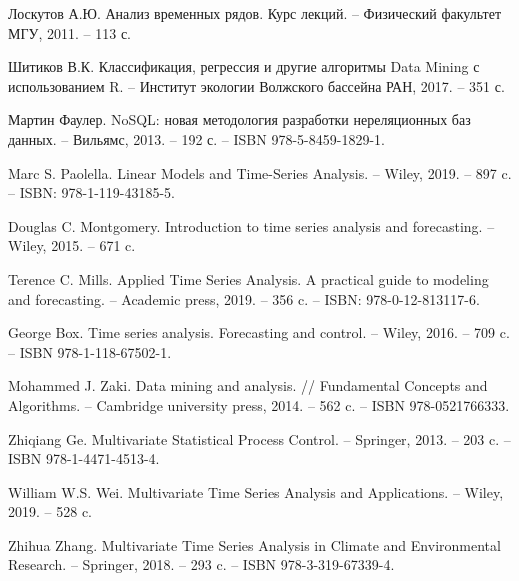 \begingroup 
\renewcommand{\section}[2]{\anonsection{Список литературы}}
\begin{thebibliography}{00}

    Лоскутов А.Ю.
    Анализ временных рядов.
    Курс лекций.
    -- Физический факультет МГУ, 2011. -- 113 с.

    Шитиков В.К.
    Классификация, регрессия и другие алгоритмы Data Mining
    с использованием R.
    -- Институт экологии Волжского бассейна РАН, 2017. -- 351 с.

    Мартин Фаулер.
    NoSQL: новая методология разработки нереляционных баз данных.
    -- Вильямс, 2013. -- 192 с.
    -- ISBN 978-5-8459-1829-1.

    Marc S. Paolella.
    Linear Models and Time-Series Analysis.
    -- Wiley, 2019. -- 897 c.
    -- ISBN: 978-1-119-43185-5.

    Douglas C. Montgomery.
    Introduction to time series analysis and forecasting.
    -- Wiley, 2015. -- 671 c.

    Terence C. Mills.
    Applied Time Series Analysis.
    A practical guide to modeling and forecasting.
    -- Academic press, 2019. -- 356 c.
    -- ISBN: 978-0-12-813117-6.

    George Box.
    Time series analysis.
    Forecasting and control.
    -- Wiley, 2016. -- 709 c.
    -- ISBN 978-1-118-67502-1.

    Mohammed J. Zaki.
    Data mining and analysis. //
    Fundamental Concepts and Algorithms.
    -- Cambridge university press, 2014. -- 562 c.
    -- ISBN 978-0521766333.

    Zhiqiang Ge.
    Multivariate Statistical Process Control.
    -- Springer, 2013. -- 203 c.
    -- ISBN 978-1-4471-4513-4.

    William W.S. Wei.
    Multivariate Time Series Analysis and Applications.
    -- Wiley, 2019. -- 528 c.

    Zhihua Zhang.
    Multivariate Time Series Analysis in Climate
    and Environmental Research.
    -- Springer, 2018. -- 293 c.
    -- ISBN 978-3-319-67339-4.


\end{thebibliography}
